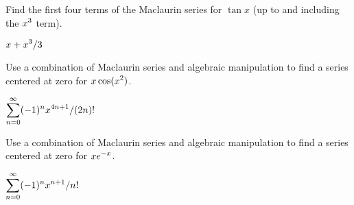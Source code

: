 \begin{exercises}
\begin{exercise} Find the first four terms of the Maclaurin series for $\tan
x$ (up to and including the $\displaystyle x^3$ term).
\begin{answer} $\displaystyle x+x^3/3$
\end{answer}\end{exercise}

\begin{exercise} Use a combination of Maclaurin series and algebraic
manipulation to find a series centered at zero for
$\displaystyle x\cos (x^2)$.
\begin{answer} $\displaystyle\sum_{n=0}^\infty (-1)^n x^{4n+1}/(2n)!$
\end{answer}\end{exercise}

\begin{exercise} Use a combination of Maclaurin series and algebraic
manipulation to find a series centered at zero for
$\displaystyle xe^{-x}$.
\begin{answer} $\displaystyle\sum_{n=0}^\infty (-1)^n x^{n+1}/n!$
\end{answer}\end{exercise}

\end{exercises}

